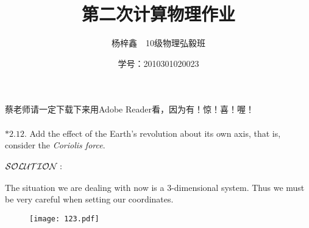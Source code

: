 \documentclass[a4paper]{article}
\author{杨梓鑫\ \ 10级物理弘毅班}
\title{第二次计算物理作业}
\date{学号：2010301020023}
\begin{document}
	\maketitle
	蔡老师请一定下载下来用Adobe Reader看，因为有！惊！喜！喔！\\\\
\noindent \sf	$*\mathbf{2.12.}$ Add the effect of the Earth's revolution about its own axis, that is, consider the \emph{Coriolis force}.\\\\
$\cal SOLUTION: $\\\\
\normalsize
\sf The situation we are dealing with now is a 3-dimensional system. Thus we must be very careful when setting our coordinates.\\
	\begin{figure}[htbp]
	\texttt{[image: 123.pdf]}
	\end{figure}
\end{document}

